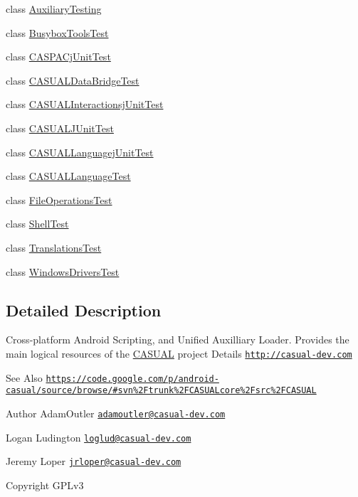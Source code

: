 \begin{DoxyCompactItemize}
\item 
class \hyperlink{classCASUAL_1_1AuxiliaryTesting}{Auxiliary\-Testing}
\item 
class \hyperlink{classCASUAL_1_1BusyboxToolsTest}{Busybox\-Tools\-Test}
\item 
class \hyperlink{classCASUAL_1_1CASPACjUnitTest}{C\-A\-S\-P\-A\-Cj\-Unit\-Test}
\item 
class \hyperlink{classCASUAL_1_1CASUALDataBridgeTest}{C\-A\-S\-U\-A\-L\-Data\-Bridge\-Test}
\item 
class \hyperlink{classCASUAL_1_1CASUALInteractionsjUnitTest}{C\-A\-S\-U\-A\-L\-Interactionsj\-Unit\-Test}
\item 
class \hyperlink{classCASUAL_1_1CASUALJUnitTest}{C\-A\-S\-U\-A\-L\-J\-Unit\-Test}
\item 
class \hyperlink{classCASUAL_1_1CASUALLanguagejUnitTest}{C\-A\-S\-U\-A\-L\-Languagej\-Unit\-Test}
\item 
class \hyperlink{classCASUAL_1_1CASUALLanguageTest}{C\-A\-S\-U\-A\-L\-Language\-Test}
\item 
class \hyperlink{classCASUAL_1_1FileOperationsTest}{File\-Operations\-Test}
\item 
class \hyperlink{classCASUAL_1_1ShellTest}{Shell\-Test}
\item 
class \hyperlink{classCASUAL_1_1TranslationsTest}{Translations\-Test}
\item 
class \hyperlink{classCASUAL_1_1WindowsDriversTest}{Windows\-Drivers\-Test}
\end{DoxyCompactItemize}


\subsection{Detailed Description}
Cross-\/platform Android Scripting, and Unified Auxilliary Loader. Provides the main logical resources of the \hyperlink{namespaceCASUAL}{C\-A\-S\-U\-A\-L} project Details \href{http://casual-dev.com}{\tt http\-://casual-\/dev.\-com} \begin{DoxySeeAlso}{See Also}
\href{https://code.google.com/p/android-casual/source/browse/#svn%2Ftrunk%2FCASUALcore%2Fsrc%2FCASUAL}{\tt https\-://code.\-google.\-com/p/android-\/casual/source/browse/\#svn\%2\-Ftrunk\%2\-F\-C\-A\-S\-U\-A\-Lcore\%2\-Fsrc\%2\-F\-C\-A\-S\-U\-A\-L} 
\end{DoxySeeAlso}
\begin{DoxyAuthor}{Author}
Adam\-Outler \href{mailto:adamoutler@casual-dev.com}{\tt adamoutler@casual-\/dev.\-com} 

Logan Ludington \href{mailto:loglud@casual-dev.com}{\tt loglud@casual-\/dev.\-com} 

Jeremy Loper \href{mailto:jrloper@casual-dev.com}{\tt jrloper@casual-\/dev.\-com} 
\end{DoxyAuthor}
\begin{DoxyCopyright}{Copyright}
G\-P\-Lv3 
\end{DoxyCopyright}
